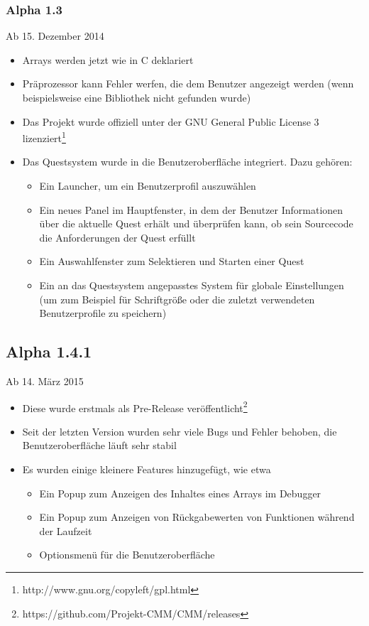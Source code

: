 \subsubsection*{Alpha 1.3}
Ab 15. Dezember 2014
\begin{itemize}
\item Arrays werden jetzt wie in C deklariert
\item Präprozessor kann Fehler werfen, die dem Benutzer angezeigt werden (wenn beispielsweise eine Bibliothek nicht gefunden wurde)
\item Das Projekt wurde offiziell unter der GNU General Public License 3 lizenziert\footnote{http://www.gnu.org/copyleft/gpl.html}
\item Das Questsystem wurde in die Benutzeroberfläche integriert. Dazu gehören:
\begin{itemize}
\item Ein Launcher, um ein Benutzerprofil auszuwählen
\item Ein neues Panel im Hauptfenster, in dem der Benutzer Informationen über die aktuelle Quest erhält und überprüfen kann, ob sein Sourcecode die Anforderungen der Quest erfüllt
\item Ein Auswahlfenster zum Selektieren und Starten einer Quest
\item Ein an das Questsystem angepasstes System für globale Einstellungen (um zum Beispiel für Schriftgröße oder die zuletzt verwendeten Benutzerprofile zu speichern)
\end{itemize}
\end{itemize}

\subsection*{Alpha 1.4.1}
Ab 14. März 2015
\begin{itemize}
\item Diese wurde erstmals als Pre-Release veröffentlicht\footnote{https://github.com/Projekt-CMM/CMM/releases}
\item Seit der letzten Version wurden sehr viele Bugs und Fehler behoben, die Benutzeroberfläche läuft sehr stabil
\item Es wurden einige kleinere Features hinzugefügt, wie etwa
\begin{itemize}
\item Ein Popup zum Anzeigen des Inhaltes eines Arrays im Debugger
\item Ein Popup zum Anzeigen von Rückgabewerten von Funktionen während der Laufzeit
\item Optionsmenü für die Benutzeroberfläche
\end{itemize}
\end{itemize}

